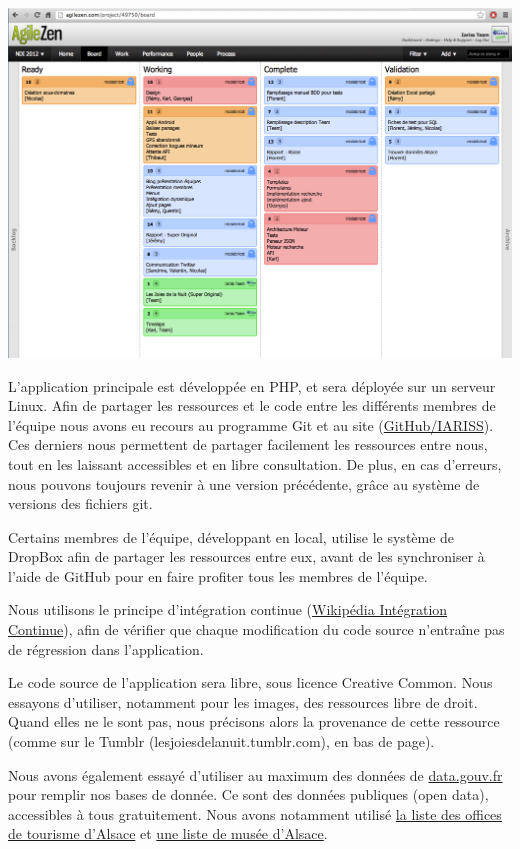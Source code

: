\documentclass[12pt, a4paper]{article}
\newcommand{\espace}{\vspace{.8cm}}
\begin{document}
\begin{center}
\includegraphics[width=.9\textwidth, keepaspectratio=true]{agile.png}
\end{center}

\espace
L'application principale est développée en PHP, et sera déployée sur un serveur Linux. Afin de partager les ressources et le code entre les différents membres de l'équipe nous avons eu recours au programme Git et au site (\href{https://github.com/IARISS}{GitHub/IARISS}). Ces derniers nous permettent de partager facilement les ressources entre nous, tout en les laissant accessibles et en libre consultation. De plus, en cas d'erreurs, nous pouvons toujours revenir à une version précédente, grâce au système de versions des fichiers git.

\espace{}
Certains membres de l'équipe, développant en local, utilise le système de DropBox afin de partager les ressources entre eux, avant de les synchroniser à l'aide de GitHub pour en faire profiter tous les membres de l'équipe.

Nous utilisons le principe d'intégration continue (\href{http://fr.wikipedia.org/wiki/Int%C3%A9gration_continue}{Wikipédia Intégration Continue}), afin de vérifier que chaque modification du code source n'entraîne pas de régression dans l'application.

Le code source de l'application sera libre, sous licence Creative Common. Nous essayons d'utiliser, notamment pour les images, des ressources libre de droit. Quand elles ne le sont pas, nous précisons alors la provenance de cette ressource (comme sur le Tumblr (lesjoiesdelanuit.tumblr.com), en bas de page).

Nous avons également essayé d'utiliser au maximum des données de \href{http://www.data.gouv.fr/}{data.gouv.fr} pour remplir nos bases de donnée. Ce sont des données publiques (open data), accessibles à tous gratuitement. Nous avons notamment utilisé \href{http://www.data.gouv.fr/donnees/view/Liste-des-offices-de-tourisme-d%27Alsace-564156}{la liste des offices de tourisme d'Alsace} et \href{http://www.data.gouv.fr/donnees/view/Fr%C3%A9quentation-2006-2010-des-mus%C3%A9es-de-France---Alsace-30382306?xtmc=alsace+mus%C3%A9e&xtcr=1}{une liste de musée d'Alsace}.
\end{document}
